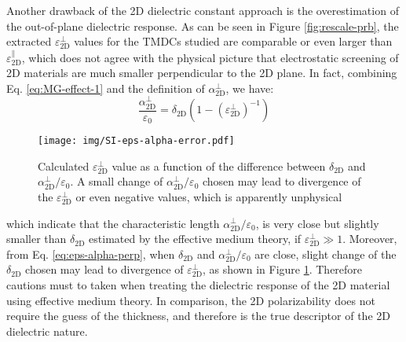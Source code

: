 \documentclass[manuscript=suppinfo,email=true,hyperref=true,keywords=false]{achemso}
\begin{document}
Another drawback of the 2D dielectric constant approach is the
overestimation of the out-of-plane dielectric response. As can be seen
in Figure \ref{fig:rescale-prb}, the extracted
$\varepsilon_{\mathrm{2D}}^{\perp}$ values for the TMDCs studied
are comparable or even larger than
$\varepsilon_{\mathrm{2D}}^{\parallel}$, which does not agree with the
physical picture that electrostatic screening of 2D materials are much
smaller perpendicular to the 2D plane. In fact, combining
Eq. \ref{eq:MG-effect-1} and the definition of $\alpha_{\mathrm{2D}}^{\perp}$, we
have:
\begin{equation}
  \label{eq:eps-alpha-perp}
  \frac{\alpha_{\mathrm{2D}}^{\perp}}{\varepsilon_{0}} = \delta_{\mathrm{2D}}(1 - (\varepsilon_{\mathrm{2D}}^{\perp})^{-1})
\end{equation}

\begin{figure}[htbp]
  \centering
  \texttt{[image: img/SI-eps-alpha-error.pdf]}
  \caption{Calculated $\varepsilon_{\mathrm{2D}}^{\perp}$ value as a
    function of the difference between $\delta_{\mathrm{2D}}$ and
    $\alpha_{\mathrm{2D}}^{\perp}/\varepsilon_{0}$. A small change of
    $\alpha_{\mathrm{2D}}^{\perp}/\varepsilon_{0}$ chosen may lead to divergence of
    the $\varepsilon_{\mathrm{2D}}^{\perp}$ or even negative values,
    which is apparently unphysical}
  \label{fig:eps-alpha-error}
\end{figure}

which indicate that the characteristic length
$\alpha_{\mathrm{2D}}^{\perp}/\varepsilon_{0}$, is very close but slightly smaller
than $\delta_{\mathrm{2D}}$ estimated by the effective medium theory,
if $\varepsilon^{\perp}_{\mathrm{2D}} \gg 1$. Moreover, from
Eq. \ref{eq:eps-alpha-perp}, when $\delta_{\mathrm{2D}}$ and
$\alpha_{\mathrm{2D}}^{\perp}/\varepsilon_{0}$ are close, slight change of the
$\delta_{\mathrm{2D}}$ chosen may lead to divergence of
$\varepsilon_{\mathrm{2D}}^{\perp}$, as shown in Figure
\ref{fig:eps-alpha-error}. Therefore cautions must to taken when
treating the dielectric response of the 2D material using effective
medium theory. In comparison, the 2D polarizability does not require
the guess of the thickness, and therefore is the true descriptor of
the 2D dielectric nature.
\end{document}
